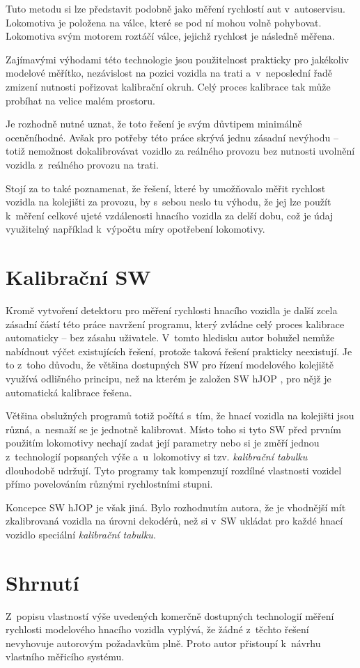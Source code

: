 Tuto metodu si lze představit podobně jako měření rychlostí aut v~autoservisu.
Lokomotiva je položena na válce, které se pod ní mohou volně pohybovat.
Lokomotiva svým motorem roztáčí válce, jejichž rychlost je následně měřena.

Zajímavými výhodami této technologie jsou použitelnost prakticky pro jakékoliv
modelové měřítko, nezávislost na pozici vozidla na trati a~v~neposlední řadě
zmizení nutnosti pořizovat kalibrační okruh. Celý proces kalibrace tak může
probíhat na velice malém prostoru.

Je rozhodně nutné uznat, že toto řešení je svým důvtipem minimálně oceněníhodné.
Avšak pro potřeby této práce skrývá jednu zásadní nevýhodu -- totiž nemožnost
dokalibrovávat vozidlo za reálného provozu bez nutnosti uvolnění vozidla
z~reálného provozu na trati.

Stojí za to také poznamenat, že řešení, které by umožňovalo měřit rychlost
vozidla na kolejišti za provozu, by s~sebou neslo tu výhodu, že jej lze použít
k~měření celkové ujeté vzdálenosti hnacího vozidla za delší dobu, což je údaj
využitelný například k~výpočtu míry opotřebení lokomotivy.

\section{Kalibrační SW}
\label{sec:kalib-sw}

Kromě vytvoření detektoru pro měření rychlosti hnacího vozidla je další zcela
zásadní částí této práce navržení programu, který zvládne celý proces
kalibrace automaticky -- bez zásahu uživatele. V~tomto hledisku autor bohužel
nemůže nabídnout výčet existujících řešení, protože taková řešení
prakticky neexistují. Je to z~toho důvodu, že většina dostupných SW pro řízení
modelového kolejiště využívá odlišného principu, než na kterém je založen SW
hJOP \cite{hjop:web}, pro nějž je automatická kalibrace řešena.

Většina obslužných programů totiž počítá s~tím, že hnací vozidla na kolejišti
jsou různá, a~nesnaží se je jednotně kalibrovat. Místo toho si tyto SW před
prvním použitím lokomotivy nechají zadat její parametry nebo si je změří jednou
z~technologií popsaných výše a~u~lokomotivy si tzv. \textit{kalibrační tabulku}
dlouhodobě udržují. Tyto programy tak kompenzují rozdílné vlastnosti vozidel přímo
povelováním různými rychlostními stupni.

Koncepce SW hJOP je však jiná. Bylo rozhodnutím autora, že je vhodnější mít
zkalibrovaná vozidla na úrovni dekodérů, než si v~SW ukládat pro každé hnací
vozidlo speciální \textit{kalibrační tabulku}.

\section{Shrnutí}
\label{sec:prehled-zaver}

Z~popisu vlastností výše uvedených komerčně dostupných technologií měření
rychlosti modelového hnacího vozidla vyplývá, že žádné z~těchto řešení
nevyhovuje autorovým požadavkům plně. Proto autor přistoupí k~návrhu vlastního
měřicího systému.
